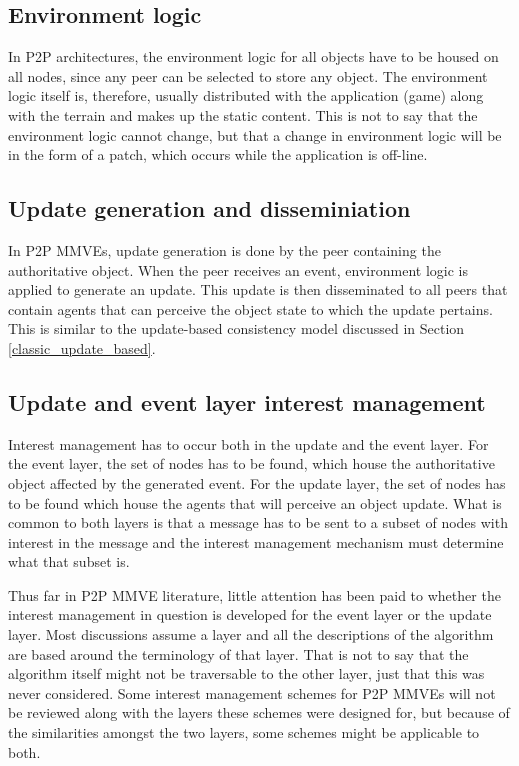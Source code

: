 \subsection{Environment logic}

In P2P architectures, the environment logic for all objects have to be housed on all nodes, since any peer can be selected to store any object. The environment logic itself is, therefore, usually distributed with the application (game) along with the terrain and makes up the static content. This is not to say that the environment logic cannot change, but that a change in environment logic will be in the form of a patch, which occurs while the application is off-line.

\subsection{Update generation and disseminiation}

In P2P MMVEs, update generation is done by the peer containing the authoritative object. When the peer receives an event, environment logic is applied to generate an update. This update is then disseminated to all peers that contain agents that can perceive the object state to which the update pertains. This is similar to the update-based consistency model discussed in Section \ref{classic_update_based}.

\subsection{Update and event layer interest management}
\label{key_challenges_im}

Interest management has to occur both in the update and the event layer. For the event layer, the set of nodes has to be found, which house the authoritative object affected by the generated event. For the update layer, the set of nodes has to be found which house the agents that will perceive an object update. What is common to both layers is that a message has to be sent to a subset of nodes with interest in the message and the interest management mechanism must determine what that subset is.

Thus far in P2P MMVE literature, little attention has been paid to whether the interest management in question is developed for the event layer or the update layer. Most discussions assume a layer and all the descriptions of the algorithm are based around the terminology of that layer. That is not to say that the algorithm itself might not be traversable to the other layer, just that this was never considered. Some interest management schemes for P2P MMVEs will not be reviewed along with the layers these schemes were designed for, but because of the similarities amongst the two layers, some schemes might be applicable to both.

